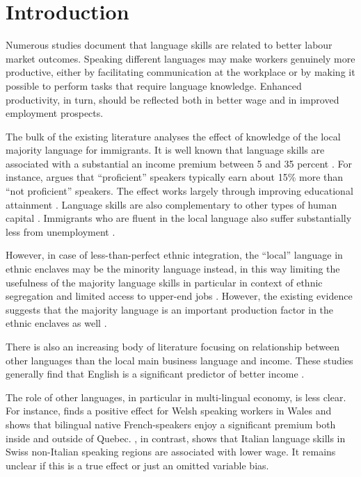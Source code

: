\documentclass[12pt, a4paper]{article}
\begin{document}
\section{Introduction}
\label{sec:introduction}
Numerous studies document that language skills are related to better
labour market outcomes.
Speaking different languages may make workers genuinely more
productive, either by facilitating communication at the workplace
or by making it possible to perform
tasks that require language knowledge.
Enhanced productivity, in turn, should be reflected both in better wage
and in improved employment prospects.

The bulk of the existing literature analyses the effect of knowledge
of the local majority language for immigrants.  It is well known that
language skills are associated with a substantial an income premium
between 5 and 35 percent
\citep{Chiswick1995,bleakley+chin2004,shields+price2002,leslie+lindley2001,chiswick+miller2002,Chiswick2003,Chiswick2010,Chiswick2015, Dustmann2003}.  For
instance, \citet{chiswick2008} argues that ``proficient'' speakers
typically earn about 15\% more than ``not proficient'' speakers.
The effect works largely through improving educational attainment
\citep{bleakley+chin2004,rooth+saarela2007native}.  Language skills are
also complementary to other types of human capital
\citep{chiswick+miller2007}.
Immigrants who are fluent in the local language also suffer
substantially less from unemployment \citep{shields+price2002, Dustmann2003}.



However, in case of less-than-perfect ethnic integration, the ``local''
language in ethnic enclaves may be the minority language instead, in
this way limiting the usefulness of the majority language skills
\citep{chiswick+miller2002,hwang+2010} in particular in context of ethnic segregation and
limited access to upper-end jobs \citep{Toomet2011}.  However, the
existing evidence suggests that the majority language is
an important production factor in the ethnic enclaves as well
\citep{zhou+logan1989, clark+drinkwater2000}.


There is also an increasing body of literature focusing on relationship
between other languages than the local main business language and
income.  These studies generally find
that English is a significant predictor of better income
\citep{Lang2009, Casale2011, Toomet2011, Williams2011, azam+2013EDandCC, isphording2013, fabo+2017E}.


The role of other languages, in particular in multi-lingual economy, is
less clear.  For instance,
\cite{Drinkwater1997} finds
a positive effect for Welsh speaking workers in
Wales and \cite{Armstrong2015} shows that bilingual native French-speakers enjoy
a significant premium both inside and outside of Quebec.
\citet{FrancoisGrin1998}, in contrast,
shows that Italian language skills in Swiss non-Italian speaking
regions are associated with lower wage.  It remains unclear if
this is a true effect or just an omitted variable bias.
\end{document}
